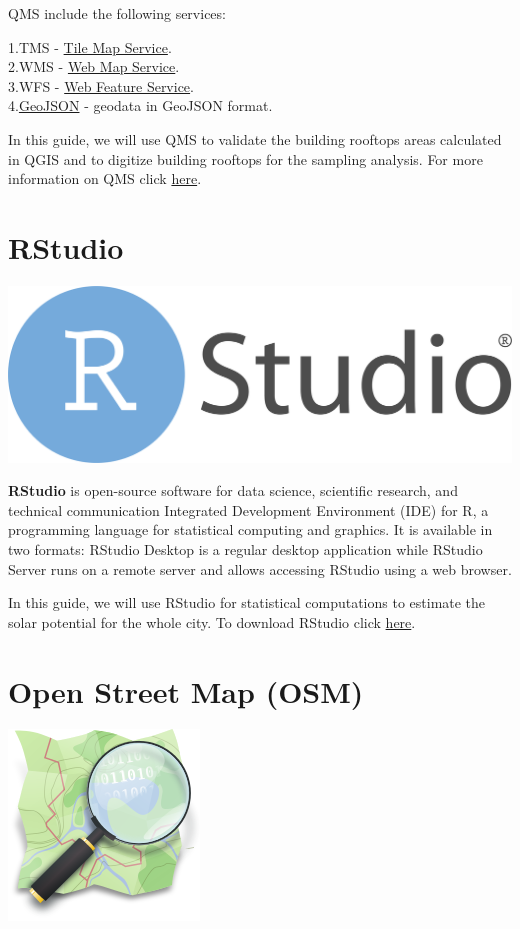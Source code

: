 \documentclass[
]{book}
\begin{document}
QMS include the following services:

1.TMS - \href{https://www.ogc.org/standards/wmts}{Tile Map Service}.\\
2.WMS - \href{https://www.ogc.org/standards/wms}{Web Map Service}.\\
3.WFS - \href{https://www.ogc.org/standards/wfs}{Web Feature Service}.\\
4.\href{https://geojson.org/}{GeoJSON} - geodata in GeoJSON format.

In this guide, we will use QMS to validate the building rooftops areas calculated in QGIS and to digitize building rooftops for the sampling analysis.
For more information on QMS click \href{https://qms.nextgis.com/faq}{here}.

\hypertarget{rstudio}{%
\section{RStudio}\label{rstudio}}

\begin{center}\includegraphics[width=0.5\linewidth]{images/rstudio_logo} \end{center}

\textbf{RStudio} is open-source software for data science, scientific research, and technical communication Integrated Development Environment (IDE) for R, a programming language for statistical computing and graphics. It is available in two formats: RStudio Desktop is a regular desktop application while RStudio Server runs on a remote server and allows accessing RStudio using a web browser.

In this guide, we will use RStudio for statistical computations to estimate the solar potential for the whole city. To download RStudio click \href{https://www.rstudio.com/products/rstudio/download/\#download}{here}.

\hypertarget{open-street-map-osm}{%
\section{Open Street Map (OSM)}\label{open-street-map-osm}}

\begin{center}\includegraphics[width=0.2\linewidth]{images/openstreetmap_logo} \end{center}
\end{document}
